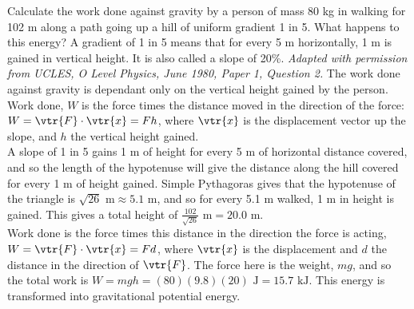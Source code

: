 \begin{hint}[O1980PIQ2a]%
{Calculate the work done against gravity by a person of mass 80 kg in walking for 102 m along a path going up a hill of uniform gradient 1 in 5. What happens to this energy?}
{A gradient of 1 in 5 means that for every 5 m horizontally, 1 m is gained in vertical height. It is also called a slope of 20\%.}
{\textit{Adapted with permission from UCLES, O Level Physics, June 1980, Paper 1, Question 2.}}
{The work done against gravity is dependant only on the vertical height gained by the person. Work done, $W$ is the force times the distance moved in the direction of the force: $W = \vtr{F}\cdot\vtr{x} = Fh$, where $\vtr{x}$ is the displacement vector up the slope, and $h$ the vertical height gained. \\

A slope of 1 in 5 gains 1 m of height for every 5 m of horizontal distance covered, and so the length of the hypotenuse will give the distance along the hill covered for every 1 m of height gained. Simple Pythagoras gives that the hypotenuse of the triangle is $\sqrt{26} \textrm{ m} \approx 5.1 \textrm{ m}$, and so for every 5.1 m walked, 1 m in height is gained. This gives a total height of $\frac{102}{\sqrt{26}} \textrm{ m} = 20.0 \textrm{ m}$.\\

Work done is the force times this distance in the direction the force is acting, $W = \vtr{F}\cdot\vtr{x} = Fd$, where $\vtr{x}$ is the displacement and $d$ the distance in the direction of $\vtr{F}$. The force here is the weight, $mg$, and so the total work is $W = mgh = (80)(9.8)(20) \textrm{ J} = 15.7 \textrm{ kJ}$. This energy is transformed into gravitational potential energy.
}
\end{hint}